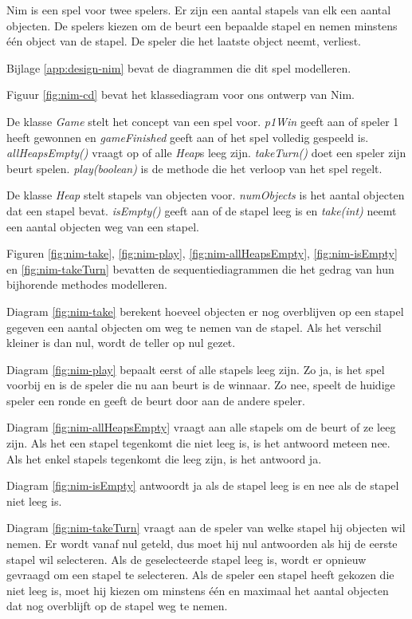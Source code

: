 Nim is een spel voor twee spelers. Er zijn een aantal stapels van elk een aantal objecten. De spelers kiezen om de beurt een bepaalde stapel en nemen minstens \'e\'en object van de stapel. De speler die het laatste object neemt, verliest.

Bijlage \ref{app:design-nim} bevat de diagrammen die dit spel modelleren.

Figuur \ref{fig:nim-cd} bevat het klassediagram voor ons ontwerp van Nim.

De klasse \textit{Game} stelt het concept van een spel voor. \textit{p1Win} geeft aan of speler 1 heeft gewonnen en \textit{gameFinished} geeft aan of het spel volledig gespeeld is. \textit{allHeapsEmpty()} vraagt op of alle \textit{Heap}s leeg zijn. \textit{takeTurn()} doet een speler zijn beurt spelen. \textit{play(boolean)} is de methode die het verloop van het spel regelt.

De klasse \textit{Heap} stelt stapels van objecten voor. \textit{numObjects} is het aantal objecten dat een stapel bevat. \textit{isEmpty()} geeft aan of de stapel leeg is en \textit{take(int)} neemt een aantal objecten weg van een stapel.

Figuren \ref{fig:nim-take}, \ref{fig:nim-play}, \ref{fig:nim-allHeapsEmpty}, \ref{fig:nim-isEmpty} en \ref{fig:nim-takeTurn} bevatten de sequentiediagrammen die het gedrag van hun bijhorende methodes modelleren.

Diagram \ref{fig:nim-take} berekent hoeveel objecten er nog overblijven op een stapel gegeven een aantal objecten om weg te nemen van de stapel. Als het verschil kleiner is dan nul, wordt de teller op nul gezet.

Diagram \ref{fig:nim-play} bepaalt eerst of alle stapels leeg zijn. Zo ja, is het spel voorbij en is de speler die nu aan beurt is de winnaar. Zo nee, speelt de huidige speler een ronde en geeft de beurt door aan de andere speler.

Diagram \ref{fig:nim-allHeapsEmpty} vraagt aan alle stapels om de beurt of ze leeg zijn. Als het een stapel tegenkomt die niet leeg is, is het antwoord meteen nee. Als het enkel stapels tegenkomt die leeg zijn, is het antwoord ja.

Diagram \ref{fig:nim-isEmpty} antwoordt ja als de stapel leeg is en nee als de stapel niet leeg is.

Diagram \ref{fig:nim-takeTurn} vraagt aan de speler van welke stapel hij objecten wil nemen. Er wordt vanaf nul geteld, dus moet hij nul antwoorden als hij de eerste stapel wil selecteren. Als de geselecteerde stapel leeg is, wordt er opnieuw gevraagd om een stapel te selecteren. Als de speler een stapel heeft gekozen die niet leeg is, moet hij kiezen om minstens \'e\'en en maximaal het aantal objecten dat nog overblijft op de stapel weg te nemen.

